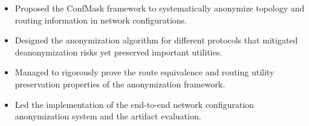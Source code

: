 


\begin{itemize}[nosep]
  \item Proposed the ConfMask framework to systematically anonymize topology and routing information in network configurations.
  \item Designed the anonymization algorithm for different protocols that mitigated deanonymization risks yet preserved important utilities.
  \item Managed to rigorously prove the route equivalence and routing utility preservation properties of the anonymization framework.
  \item Led the implementation of the end-to-end network configuration anonymization system and the artifact evaluation.
\end{itemize}
